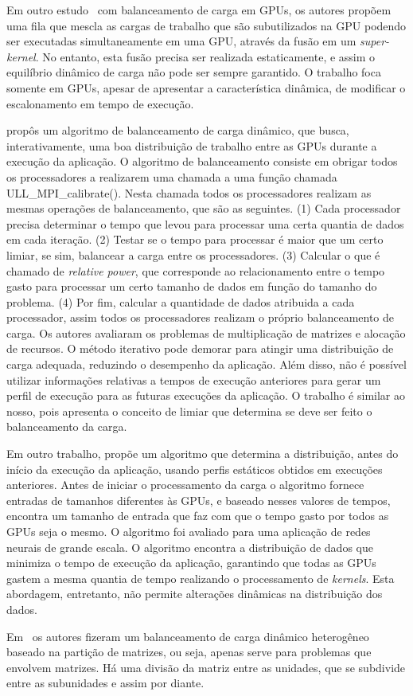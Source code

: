 Em outro estudo~\citep{tasks} com balanceamento de carga em GPUs, os autores propõem uma fila que mescla as cargas de trabalho que são subutilizados na GPU podendo ser executadas simultaneamente em uma GPU, através da fusão em um \textit{super-kernel}. No entanto, esta fusão precisa ser realizada estaticamente, e assim o equilíbrio dinâmico de carga não pode ser sempre garantido. O trabalho foca somente em GPUs, apesar de apresentar a característica dinâmica, de modificar o escalonamento em tempo de execução.

\citep{acosta} propôs um algoritmo de balanceamento de carga
dinâmico, que busca, interativamente, uma boa distribuição de trabalho entre as
GPUs durante a execução da aplicação. O algoritmo de balanceamento consiste em obrigar todos os processadores a realizarem uma chamada a uma função chamada ULL_MPI_calibrate(). Nesta chamada todos os processadores realizam as mesmas operações de balanceamento, que são as seguintes. (1) Cada processador precisa determinar o tempo que levou para processar uma certa quantia de dados em cada iteração. (2) Testar se o tempo para processar é maior que um certo limiar, se sim, balancear a carga entre os processadores. (3) Calcular o que é chamado de \emph{relative power}, que corresponde ao relacionamento entre o tempo gasto para processar um certo tamanho de dados em função do tamanho do problema. (4) Por fim, calcular a quantidade de dados atribuida a cada processador, assim todos os processadores realizam o próprio balanceamento de carga. Os autores avaliaram os problemas de
multiplicação de matrizes e alocação de recursos. O método iterativo pode
demorar para atingir uma distribuição de carga adequada, reduzindo o desempenho
da aplicação. Além disso, não é possível utilizar informações relativas a tempos
de execução anteriores para gerar um perfil de execução para as futuras
execuções da aplicação. O trabalho é similar ao nosso, pois apresenta o conceito de limiar que determina se deve ser feito o balanceamento da carga.

Em outro trabalho, \citep{raphael} propõe um algoritmo que determina a
distribuição, antes do início da execução da aplicação, usando perfis estáticos
obtidos em execuções anteriores. Antes de iniciar o processamento da carga o algoritmo fornece entradas de tamanhos diferentes às GPUs, e baseado nesses valores de tempos, encontra um tamanho de entrada que faz com que o tempo gasto por todos as GPUs seja o mesmo.
O algoritmo foi avaliado para uma aplicação de
redes neurais de grande escala. O algoritmo encontra a distribuição de dados que
minimiza o tempo de execução da aplicação, garantindo que todas as GPUs gastem a
mesma quantia de tempo realizando o processamento de \emph{kernels}. Esta
abordagem, entretanto, não permite alterações dinâmicas na distribuição dos
dados. 

Em~\citep{Clarke:2012:HPA:2402420.2402479}  os autores fizeram um balanceamento de carga dinâmico heterogêneo baseado na partição de matrizes, ou seja, apenas serve para problemas que envolvem matrizes. Há uma divisão da matriz entre as unidades, que se subdivide entre as subunidades e assim por diante. 







